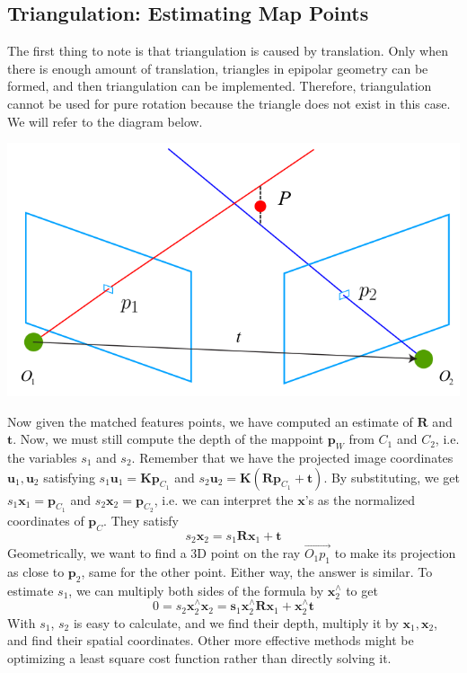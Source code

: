 \documentclass{article}
\theoremstyle{definition}
\theoremstyle{remark}
\theoremstyle{definition}
\begin{document}
\subsection{Triangulation: Estimating Map Points}

The first thing to note is that triangulation is caused by translation. Only when there is enough amount of translation, triangles in epipolar geometry can be formed, and then triangulation can be implemented. Therefore, triangulation cannot be used for pure rotation because the triangle does not exist in this case. We will refer to the diagram below. 

\begin{center}
    \includegraphics[scale=0.35]{img/triangulation.png}
\end{center}

Now given the matched features points, we have computed an estimate of $\mathbf{R}$ and $\mathbf{t}$. Now, we must still compute the depth of the mappoint $\mathbf{p}_W$ from $C_1$ and $C_2$, i.e. the variables $s_1$ and $s_2$. Remember that we have the projected image coordinates $\mathbf{u}_1, \mathbf{u}_2$ satisfying $s_1 \mathbf{u}_1 = \mathbf{K} \mathbf{p}_{C_1}$ and $s_2 \mathbf{u}_2 = \mathbf{K} (\mathbf{R} \mathbf{p}_{C_1} + \mathbf{t})$. By substituting, we get $s_1 \mathbf{x}_1 = \mathbf{p}_{C_1}$ and $s_2 \mathbf{x}_2 = \mathbf{p}_{C_2}$, i.e. we can interpret the $\mathbf{x}$'s as the normalized coordinates of $\mathbf{p}_C$. They satisfy 
\[s_2 \mathbf{x}_2 = s_1 \mathbf{R} \mathbf{x}_1 + \mathbf{t}\]
Geometrically, we want to find a 3D point on the ray $\overrightarrow{O_1 p_1}$ to make its projection as close to $\mathbf{p}_2$, same for the other point. Either way, the answer is similar. To estimate $s_1$, we can multiply both sides of the formula by $\mathbf{x}_2^\wedge$ to get 
\[0 = s_2 \mathbf{x}_2^\wedge \mathbf{x}_2 = \mathbf{s}_1 \mathbf{x}_2^\wedge \mathbf{R} \mathbf{x}_1 + \mathbf{x}_2^\wedge \mathbf{t}\]
With $s_1$, $s_2$ is easy to calculate, and we find their depth, multiply it by $\mathbf{x}_1, \mathbf{x}_2$, and find their spatial coordinates. Other more effective methods might be optimizing a least square cost function rather than directly solving it. 
\end{document}
